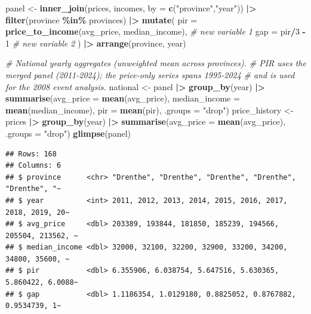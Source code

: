 \documentclass[
]{article}
\newenvironment{Shaded}{\begin{snugshade}}{\end{snugshade}}
\newcommand{\AttributeTok}[1]{\textcolor[rgb]{0.13,0.29,0.53}{#1}}
\newcommand{\CommentTok}[1]{\textcolor[rgb]{0.56,0.35,0.01}{\textit{#1}}}
\newcommand{\DecValTok}[1]{\textcolor[rgb]{0.00,0.00,0.81}{#1}}
\newcommand{\FunctionTok}[1]{\textcolor[rgb]{0.13,0.29,0.53}{\textbf{#1}}}
\newcommand{\NormalTok}[1]{#1}
\newcommand{\OtherTok}[1]{\textcolor[rgb]{0.56,0.35,0.01}{#1}}
\newcommand{\SpecialCharTok}[1]{\textcolor[rgb]{0.81,0.36,0.00}{\textbf{#1}}}
\newcommand{\StringTok}[1]{\textcolor[rgb]{0.31,0.60,0.02}{#1}}
\begin{document}
\begin{Shaded}
\begin{Highlighting}[]
\NormalTok{panel }\OtherTok{\textless{}{-}} \FunctionTok{inner\_join}\NormalTok{(prices, incomes, }\AttributeTok{by =} \FunctionTok{c}\NormalTok{(}\StringTok{"province"}\NormalTok{,}\StringTok{"year"}\NormalTok{)) }\SpecialCharTok{|\textgreater{}}
  \FunctionTok{filter}\NormalTok{(province }\SpecialCharTok{\%in\%}\NormalTok{ provinces) }\SpecialCharTok{|\textgreater{}}
  \FunctionTok{mutate}\NormalTok{(}
    \AttributeTok{pir =} \FunctionTok{price\_to\_income}\NormalTok{(avg\_price, median\_income),  }\CommentTok{\# new variable 1}
    \AttributeTok{gap =}\NormalTok{ pir}\SpecialCharTok{/}\DecValTok{3} \SpecialCharTok{{-}} \DecValTok{1}                                    \CommentTok{\# new variable 2}
\NormalTok{  ) }\SpecialCharTok{|\textgreater{}}
  \FunctionTok{arrange}\NormalTok{(province, year)}

\CommentTok{\# National yearly aggregates (unweighted mean across provinces).}
\CommentTok{\# PIR uses the merged panel (2011{-}2024); the price{-}only series spans 1995{-}2024}
\CommentTok{\# and is used for the 2008 event analysis.}
\NormalTok{national }\OtherTok{\textless{}{-}}\NormalTok{ panel }\SpecialCharTok{|\textgreater{}}
  \FunctionTok{group\_by}\NormalTok{(year) }\SpecialCharTok{|\textgreater{}}
  \FunctionTok{summarise}\NormalTok{(}\AttributeTok{avg\_price =} \FunctionTok{mean}\NormalTok{(avg\_price), }\AttributeTok{median\_income =} \FunctionTok{mean}\NormalTok{(median\_income),}
            \AttributeTok{pir =} \FunctionTok{mean}\NormalTok{(pir), }\AttributeTok{.groups =} \StringTok{"drop"}\NormalTok{)}
\NormalTok{price\_history }\OtherTok{\textless{}{-}}\NormalTok{ prices }\SpecialCharTok{|\textgreater{}}
  \FunctionTok{group\_by}\NormalTok{(year) }\SpecialCharTok{|\textgreater{}} \FunctionTok{summarise}\NormalTok{(}\AttributeTok{avg\_price =} \FunctionTok{mean}\NormalTok{(avg\_price), }\AttributeTok{.groups =} \StringTok{"drop"}\NormalTok{)}
\FunctionTok{glimpse}\NormalTok{(panel)}
\end{Highlighting}
\end{Shaded}

\begin{verbatim}
## Rows: 168
## Columns: 6
## $ province      <chr> "Drenthe", "Drenthe", "Drenthe", "Drenthe", "Drenthe", "~
## $ year          <int> 2011, 2012, 2013, 2014, 2015, 2016, 2017, 2018, 2019, 20~
## $ avg_price     <dbl> 203389, 193844, 181850, 185239, 194566, 205504, 213562, ~
## $ median_income <dbl> 32000, 32100, 32200, 32900, 33200, 34200, 34800, 35600, ~
## $ pir           <dbl> 6.355906, 6.038754, 5.647516, 5.630365, 5.860422, 6.0088~
## $ gap           <dbl> 1.1186354, 1.0129180, 0.8825052, 0.8767882, 0.9534739, 1~
\end{verbatim}
\end{document}
